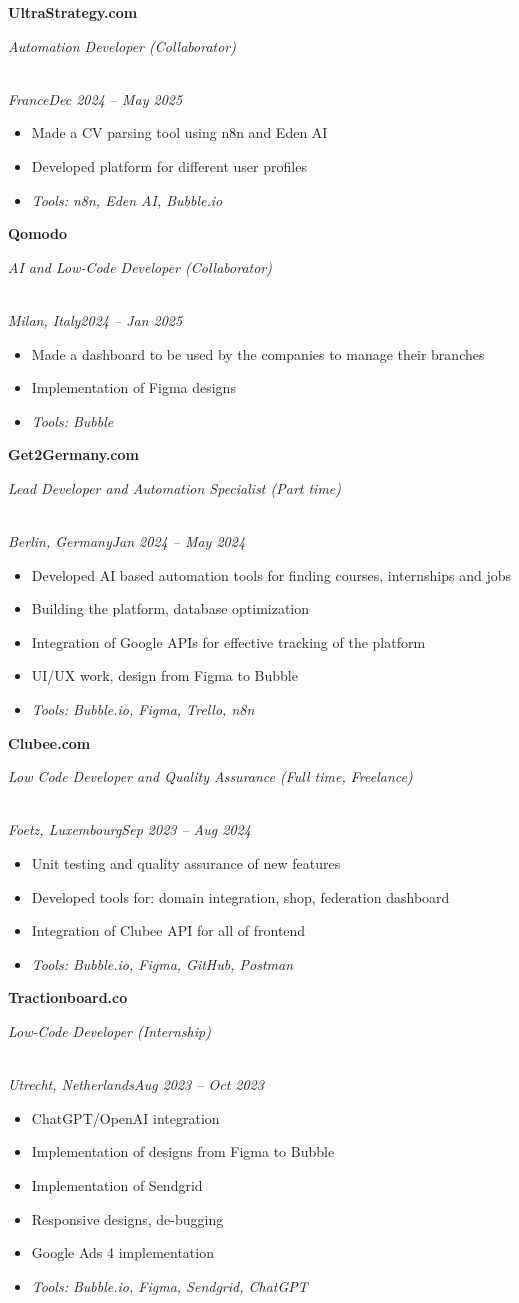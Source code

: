 \documentclass[a4paper,10pt]{article}
\newcommand{\role}[4]{\vspace{3pt}\noindent\hspace{0.6em}\parbox[t]{0.38\textwidth}{\raggedright\textbf{#1}}\hfill\parbox[t]{0.58\textwidth}{\raggedleft\textit{#2}}\\{\textit{#3}\hfill\textit{#4}}\vspace{1pt}}
\begin{document}
\role{UltraStrategy.com}{Automation Developer (Collaborator)}{France}{Dec 2024 -- May 2025}
\begin{itemize}
\item Made a CV parsing tool using n8n and Eden AI
\item Developed platform for different user profiles
\item \textit{Tools: n8n, Eden AI, Bubble.io}
\end{itemize}

\role{Qomodo}{AI and Low-Code Developer (Collaborator)}{Milan, Italy}{2024 -- Jan 2025}
\begin{itemize}
\item Made a dashboard to be used by the companies to manage their branches
\item Implementation of Figma designs
\item \textit{Tools: Bubble}
\end{itemize}

\role{Get2Germany.com}{Lead Developer and Automation Specialist (Part time)}{Berlin, Germany}{Jan 2024 -- May 2024}
\begin{itemize}
\item Developed AI based automation tools for finding courses, internships and jobs
\item Building the platform, database optimization
\item Integration of Google APIs for effective tracking of the platform
\item UI/UX work, design from Figma to Bubble
\item \textit{Tools: Bubble.io, Figma, Trello, n8n}
\end{itemize}

\role{Clubee.com}{Low Code Developer and Quality Assurance (Full time, Freelance)}{Foetz, Luxembourg}{Sep 2023 -- Aug 2024}
\begin{itemize}
\item Unit testing and quality assurance of new features
\item Developed tools for: domain integration, shop, federation dashboard
\item Integration of Clubee API for all of frontend
\item \textit{Tools: Bubble.io, Figma, GitHub, Postman}
\end{itemize}

\role{Tractionboard.co}{Low-Code Developer (Internship)}{Utrecht, Netherlands}{Aug 2023 -- Oct 2023}
\begin{itemize}
\item ChatGPT/OpenAI integration
\item Implementation of designs from Figma to Bubble
\item Implementation of Sendgrid
\item Responsive designs, de-bugging
\item Google Ads 4 implementation
\item \textit{Tools: Bubble.io, Figma, Sendgrid, ChatGPT}
\end{itemize}
\end{document}

